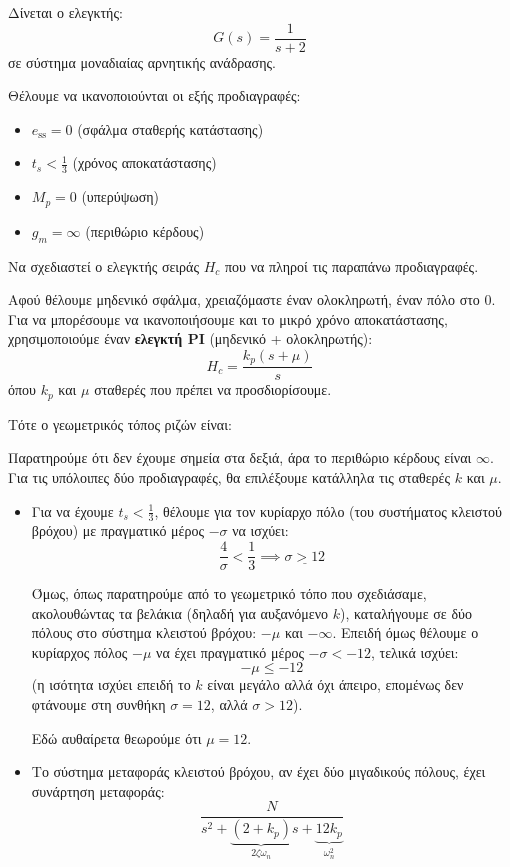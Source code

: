 \documentclass[11pt,a4paper,notitlepage,fleqn]{article}
\begin{document}
\begin{exercise}
Δίνεται ο ελεγκτής:
\[
G(s) = \frac{1}{s+2}
\]
σε σύστημα μοναδιαίας αρνητικής ανάδρασης.

Θέλουμε να ικανοποιούνται οι εξής προδιαγραφές:
\begin{itemize}
	\item \( e_{\mathrm{ss}} = 0 \) (σφάλμα σταθερής κατάστασης)
	\item \( t_s < \frac{1}{3} \) (χρόνος αποκατάστασης)
	\item \( M_p = 0 \) (υπερύψωση)
	\item \( g_m = \infty \) (περιθώριο κέρδους)
\end{itemize}

Να σχεδιαστεί ο ελεγκτής σειράς \( H_c \) που να πληροί τις παραπάνω προδιαγραφές.


\tcblower
Αφού θέλουμε μηδενικό σφάλμα, χρειαζόμαστε έναν ολοκληρωτή, έναν πόλο στο 0. Για να μπορέσουμε
να ικανοποιήσουμε και το μικρό χρόνο αποκατάστασης, χρησιμοποιούμε έναν \textbf{ελεγκτή PI}
(μηδενικό + ολοκληρωτής):
\[
H_c = \frac{k_p(s+μ)}{s}
\]
όπου \( k_p \) και \( μ \) σταθερές που πρέπει να προσδιορίσουμε.

Τότε ο γεωμετρικός τόπος ριζών είναι:

Παρατηρούμε ότι δεν έχουμε σημεία στα δεξιά, άρα το περιθώριο κέρδους είναι \( \infty \).
Για τις υπόλοιπες δύο προδιαγραφές, θα επιλέξουμε κατάλληλα τις σταθερές \( k \) και
\( μ \).

\begin{itemize}
	\item Για να έχουμε \( t_s < \frac{1}{3} \), θέλουμε για τον κυρίαρχο πόλο (του
	συστήματος κλειστού βρόχου) με πραγματικό
	μέρος \( -σ \) να ισχύει:
	\[
	\frac{4}{σ} < \frac{1}{3} \implies \underline{σ>12}
	\]
	
	Όμως, όπως παρατηρούμε από το γεωμετρικό τόπο που σχεδιάσαμε, ακολουθώντας τα βελάκια
	(δηλαδή για αυξανόμενο \( k \)), καταλήγουμε σε δύο πόλους στο σύστημα
	κλειστού βρόχου: \( -μ \) και \( -\infty \). Επειδή όμως θέλουμε ο κυρίαρχος πόλος
	\( -μ \) να έχει πραγματικό μέρος \( -σ < -12 \), τελικά ισχύει:
	\[
	-μ \leq -12
	\]
	(η ισότητα ισχύει επειδή το \( k \) είναι μεγάλο αλλά όχι άπειρο, επομένως δεν φτάνουμε
	στη συνθήκη \( σ = 12 \), αλλά \( σ>12 \)).
	
	Εδώ αυθαίρετα θεωρούμε ότι \( μ=12 \). 
	
	\item Το σύστημα μεταφοράς κλειστού βρόχου, αν έχει δύο μιγαδικούς πόλους,
	έχει συνάρτηση μεταφοράς:
	\[
	\frac{N}{s^2 + \underbrace{(2+k_p)}_{2ζ\omega_n} s + \underbrace{12k_p}_{\omega_n^2}}
	\]
	

\end{itemize}
\end{exercise}
\end{document}
